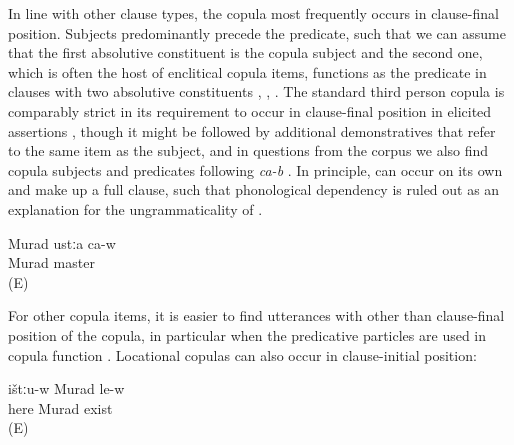 In line with other clause types, the copula most frequently occurs in clause-final position. Subjects predominantly precede the predicate, such that we can assume that the first absolutive constituent is the copula subject and the second one, which is often the host of enclitical copula items, functions as the predicate in clauses with two absolutive constituents , , . The standard third person copula  is comparably strict in its requirement to occur in clause-final position in elicited assertions , though it might be followed by additional demonstratives that refer to the same item as the subject, and in questions from the corpus we also find copula subjects and predicates following \textit{ca-b} . In principle,  can occur on its own and make up a full clause, such that phonological dependency is ruled out as an explanation for the ungrammaticality of . 


\begin{exe}
	\ex	\label{ex:Murad is a / the master}
	\begin{xlist}
		\ex	\label{ex:Murad is a / the master@A}
		\gll	Murad	ustːa ca-w\\
			Murad master \\
		\glt	{} (E)
	
		 \label{ex:Murad is a / the master@B}
		 \label{ex:Murad is a / the master@C}
	\end{xlist}
\end{exe}

For other copula items, it is easier to find utterances with other than clause-final position of the copula, in particular when the predicative particles are used in copula function . Locational copulas can also occur in clause-initial position:
%
\begin{exe}
	\ex	\label{ex:Murad is here}
	\begin{xlist}
		\ex	\label{ex:Murad is here@A}
		\gll	ištːu-w	Murad	le-w\\
			here	Murad	exist\tsc{-m}\\
		\glt	\sqt{Murad is here.} (E)
	
		\ex	{}	\label{ex:Murad is here@B}
	\end{xlist}
\end{exe}


